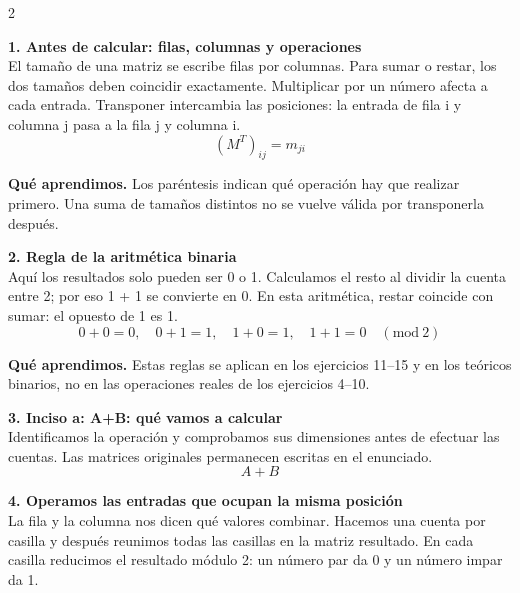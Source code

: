 \documentclass[11pt,a4paper,landscape]{article}
\begin{document}
\begin{multicols*}{2}
\noindent\begin{minipage}{\linewidth}\textbf{1. Antes de calcular: filas, columnas y operaciones}\\[2pt]El tamaño de una matriz se escribe filas por columnas. Para sumar o restar, los dos tamaños deben coincidir exactamente. Multiplicar por un número afecta a cada entrada. Transponer intercambia las posiciones: la entrada de fila i y columna j pasa a la fila j y columna i.
\[(M^T)_{ij}=m_{ji}\]
\par\smallskip\textbf{Qué aprendimos.} Los paréntesis indican qué operación hay que realizar primero. Una suma de tamaños distintos no se vuelve válida por transponerla después.
\end{minipage}\par\medskip
\noindent\begin{minipage}{\linewidth}\textbf{2. Regla de la aritmética binaria}\\[2pt]Aquí los resultados solo pueden ser 0 o 1. Calculamos el resto al dividir la cuenta entre 2; por eso 1 + 1 se convierte en 0. En esta aritmética, restar coincide con sumar: el opuesto de 1 es 1.
\[0+0=0,\quad 0+1=1,\quad1+0=1,\quad1+1=0\quad(\mathrm{mod}\ 2)\]
\par\smallskip\textbf{Qué aprendimos.} Estas reglas se aplican en los ejercicios 11–15 y en los teóricos binarios, no en las operaciones reales de los ejercicios 4–10.
\end{minipage}\par\medskip
\noindent\begin{minipage}{\linewidth}\textbf{3. Inciso a: A+B: qué vamos a calcular}\\[2pt]Identificamos la operación y comprobamos sus dimensiones antes de efectuar las cuentas. Las matrices originales permanecen escritas en el enunciado.
\[A+B\]
\end{minipage}\par\medskip
\noindent\begin{minipage}{\linewidth}\textbf{4. Operamos las entradas que ocupan la misma posición}\\[2pt]La fila y la columna nos dicen qué valores combinar. Hacemos una cuenta por casilla y después reunimos todas las casillas en la matriz resultado. En cada casilla reducimos el resultado módulo 2: un número par da 0 y un número impar da 1.
\par{}\par\smallskip

\end{minipage}
\end{multicols*}
\end{document}
